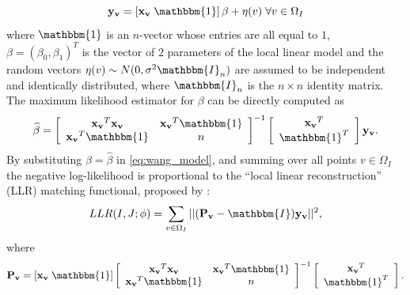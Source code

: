 \begin{equation}\label{eq:wang_model}
    \mathbf{y_{v}} = \left[\mathbf{x_{v}} \; \mathbbm{1}\right]\beta + \eta(v) \; \forall v\in\Omega_{I}
\end{equation}
where $\mathbbm{1}$ is an $n$-vector whose entries are all equal to $1$,  $\beta = (\beta_{0}, \beta_{1})^{T}$ is the vector of $2$ parameters of the local linear model and the random vectors $\eta(v)\sim N(0, \sigma^{2} \mathbbm{I}_{n})$ are assumed to be independent and identically distributed, where $\mathbbm{I}_{n}$ is the $n \times n$ identity matrix. The maximum likelihood estimator for $\beta$ can be directly computed as
\begin{equation}\label{eq:wang_model_mle_beta}
    \widehat{\beta} =
    \left[\begin{array}{cc}
        \mathbf{x_{v}}^{T}\mathbf{x_{v}} & \mathbf{x_{v}}^{T}\mathbbm{1}\\
        \mathbf{x_{v}}^{T}\mathbbm{1} & n
    \end{array}\right]^{-1}
    \left[\begin{array}{c}
        \mathbf{x_{v}}^{T}\\
        \mathbbm{1}^{T}
    \end{array}\right]\mathbf{y_{v}}.
\end{equation}
By substituting $\beta = \widehat{\beta}$ in \eqref{eq:wang_model}, and summing over all points $v\in\Omega_{I}$ the negative log-likelihood is proportional to the ``local linear reconstruction'' (LLR) matching functional, proposed by \cite{Wang2014}:
\begin{equation}\label{eq:wang_metric}
    LLR(I, J;\phi) = \sum_{v\in\Omega_{I}}|| (\mathbf{P_{v}} - \mathbbm{I})\mathbf{y_{v}}||^{2},
\end{equation}
where
\begin{equation}\label{eq:def_P_v}
    \mathbf{P_v} = [\mathbf{x_{v}} \; \mathbbm{1}]
    \left[\begin{array}{cc}
        \mathbf{x_{v}}^{T}\mathbf{x_{v}} & \mathbf{x_{v}}^{T}\mathbbm{1}\\
        \mathbf{x_{v}}^{T}\mathbbm{1} & n
    \end{array}\right]^{-1}
    \left[\begin{array}{c}
        \mathbf{x_{v}}^{T}\\
        \mathbbm{1}^{T}
    \end{array}\right].
\end{equation}
